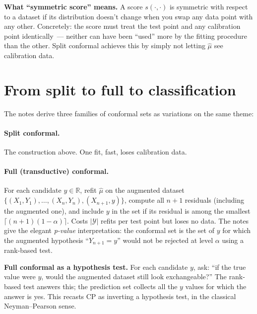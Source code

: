 \documentclass[letterpaper,11pt,leqno]{article}
\begin{document}
\begin{definitionexplain}
\textbf{What ``symmetric score'' means.} A score $s(\cdot, \cdot)$ is symmetric with respect to a dataset if its distribution doesn't change when you swap any data point with any other. Concretely: the score must treat the test point and any calibration point identically~--- neither can have been ``used'' more by the fitting procedure than the other. Split conformal achieves this by simply not letting $\hat{\mu}$ see calibration data.
\end{definitionexplain}

\section{From split to full to classification}\label{s:construction}

The notes derive three families of conformal sets as variations on the same theme:

\paragraph{Split conformal.} The construction above. One fit, fast, loses calibration data.

\paragraph{Full (transductive) conformal.} For each candidate $y \in \mathbb{R}$, refit $\hat{\mu}$ on the augmented dataset $\{(X_1, Y_1), \dots, (X_n, Y_n), (X_{n+1}, y)\}$, compute all $n+1$ residuals (including the augmented one), and include $y$ in the set if its residual is among the smallest $\lceil(n+1)(1-\alpha)\rceil$. Costs $|\mathcal{Y}|$ refits per test point but loses no data. The notes give the elegant \emph{p-value} interpretation: the conformal set is the set of $y$ for which the augmented hypothesis ``$Y_{n+1} = y$'' would not be rejected at level $\alpha$ using a rank-based test.

\begin{algorithmexplain}
\textbf{Full conformal as a hypothesis test.} For each candidate $y$, ask: ``if the true value were $y$, would the augmented dataset still look exchangeable?'' The rank-based test answers this; the prediction set collects all the $y$ values for which the answer is yes. This recasts CP as inverting a hypothesis test, in the classical Neyman--Pearson sense.
\end{algorithmexplain}
\end{document}
